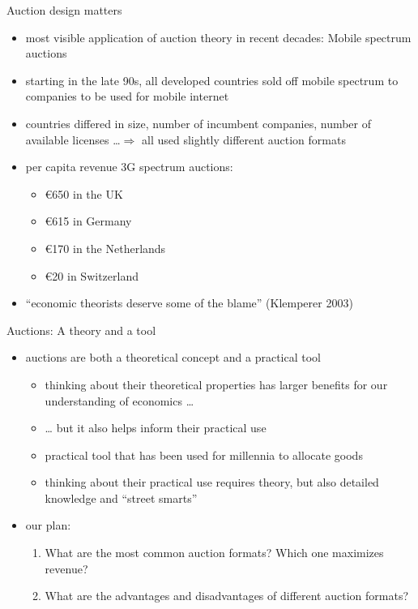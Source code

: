 \documentclass[bigger]{beamer}
\begin{document}
\begin{frame}[label={sec:orgb8892c9}]{Auction design matters}
\begin{itemize}
\item most visible application of auction theory in recent decades: Mobile spectrum auctions
\item starting in the late 90s, all developed countries sold off mobile spectrum to companies to be used for mobile internet
\item countries differed in size, number of incumbent companies, number of available licenses \ldots{}\linebreak \(\Rightarrow\)  all used slightly different auction formats
\item per capita revenue 3G spectrum auctions:
\begin{itemize}
\item €650 in the UK
\item €615 in Germany
\item €170 in the Netherlands
\item €20 in Switzerland
\end{itemize}
\item “economic theorists deserve some of the blame” (Klemperer 2003)
\end{itemize}
\end{frame}

\begin{frame}[label={sec:org66791c9}]{Auctions: A theory and a tool}
\begin{itemize}
\item auctions are both a theoretical concept and a practical tool
\begin{itemize}
\item thinking about their theoretical properties has larger beneﬁts for our understanding of economics \ldots{}
\item \ldots{} but it also helps inform their practical use
\item practical tool that has been used for millennia to allocate goods
\item thinking about their practical use requires theory, but also detailed knowledge and “street smarts”
\end{itemize}
\item our plan:
\begin{enumerate}
\item What are the most common auction formats? Which one maximizes revenue?
\item What are the advantages and disadvantages of different auction formats?
\end{enumerate}
\end{itemize}
\end{frame}
\end{document}
